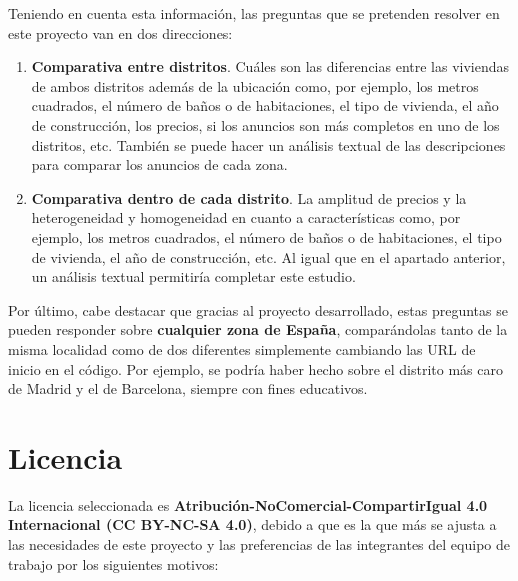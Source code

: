 \documentclass[12pt]{article}
\begin{document}
Teniendo en cuenta esta información, las preguntas que se pretenden resolver en este proyecto van en dos direcciones:
\begin{enumerate}
	\item \textbf{Comparativa entre distritos}. Cuáles son las diferencias entre las viviendas de ambos distritos además de la ubicación como, por ejemplo, los metros cuadrados, el número de baños o de habitaciones, el tipo de vivienda, el año de construcción, los precios, si los anuncios son más completos en uno de los distritos, etc. También se puede hacer un análisis textual de las descripciones para comparar los anuncios de cada zona.
	\item \textbf{Comparativa dentro de cada distrito}. La amplitud de precios y la heterogeneidad y homogeneidad en cuanto a características como, por ejemplo, los metros cuadrados, el número de baños o de habitaciones, el tipo de vivienda, el año de construcción, etc. Al igual que en el apartado anterior, un análisis textual permitiría completar este estudio. 
\end{enumerate}

Por último, cabe destacar que gracias al proyecto desarrollado, estas preguntas se pueden responder sobre \textbf{cualquier zona de España}, comparándolas tanto de la misma localidad como de dos diferentes simplemente cambiando las URL de inicio en el código. Por ejemplo, se podría haber hecho sobre el distrito más caro de Madrid y el de Barcelona, siempre con fines educativos.

\vspace{-1.5em}\section{Licencia }\vspace{-1.5em}

La licencia seleccionada es\textbf{ Atribución-NoComercial-CompartirIgual 4.0 Internacional (CC BY-NC-SA 4.0)}, debido a que es la que más se ajusta a las necesidades de este proyecto y las preferencias de las integrantes del equipo de trabajo por los siguientes motivos:
\end{document}
